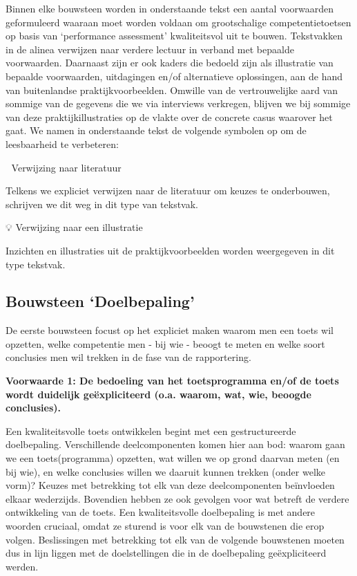 \documentclass[
  letterpaper,
]{report}
\begin{document}
Binnen elke bouwsteen worden in onderstaande tekst een aantal
voorwaarden geformuleerd waaraan moet worden voldaan om grootschalige
competentietoetsen op basis van `performance assessment' kwaliteitsvol
uit te bouwen. Tekstvakken in de alinea verwijzen naar verdere lectuur
in verband met bepaalde voorwaarden. Daarnaast zijn er ook kaders die
bedoeld zijn als illustratie van bepaalde voorwaarden, uitdagingen en/of
alternatieve oplossingen, aan de hand van buitenlandse
praktijkvoorbeelden. Omwille van de vertrouwelijke aard van sommige van
de gegevens die we via interviews verkregen, blijven we bij sommige van
deze praktijkillustraties op de vlakte over de concrete casus waarover
het gaat. We namen in onderstaande tekst de volgende symbolen op om de
leesbaarheid te verbeteren:

📖 Verwijzing naar literatuur

Telkens we expliciet verwijzen naar de literatuur om keuzes te
onderbouwen, schrijven we dit weg in dit type van tekstvak.

💡 Verwijzing naar een illustratie

Inzichten en illustraties uit de praktijkvoorbeelden worden weergegeven
in dit type tekstvak.

\hypertarget{bouwsteen-doelbepaling}{%
\subsection{Bouwsteen `Doelbepaling'}\label{bouwsteen-doelbepaling}}

De eerste bouwsteen focust op het expliciet maken waarom men een toets
wil opzetten, welke competentie men - bij wie - beoogt te meten en welke
soort conclusies men wil trekken in de fase van de rapportering.

\textbf{Voorwaarde 1: De bedoeling van het toetsprogramma en/of de toets
wordt duidelijk geëxpliciteerd (o.a. waarom, wat, wie, beoogde
conclusies).}

Een kwaliteitsvolle toets ontwikkelen begint met een gestructureerde
doelbepaling. Verschillende deelcomponenten komen hier aan bod: waarom
gaan we een toets(programma) opzetten, wat willen we op grond daarvan
meten (en bij wie), en welke conclusies willen we daaruit kunnen trekken
(onder welke vorm)? Keuzes met betrekking tot elk van deze
deelcomponenten beïnvloeden elkaar wederzijds. Bovendien hebben ze ook
gevolgen voor wat betreft de verdere ontwikkeling van de toets. Een
kwaliteitsvolle doelbepaling is met andere woorden cruciaal, omdat ze
sturend is voor elk van de bouwstenen die erop volgen. Beslissingen met
betrekking tot elk van de volgende bouwstenen moeten dus in lijn liggen
met de doelstellingen die in de doelbepaling geëxpliciteerd werden.
\end{document}
